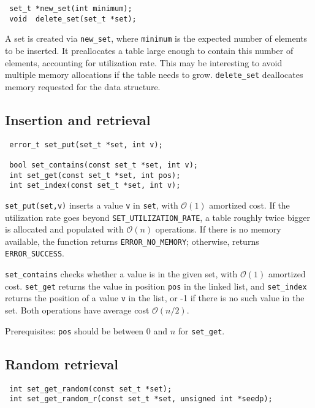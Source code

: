 \begin{lstlisting}
 set_t *new_set(int minimum);
 void  delete_set(set_t *set);
\end{lstlisting}

A set is created via \lstinline!new_set!, where \lstinline!minimum! is the expected number of
elements to be inserted. It preallocates a table large enough to contain this number of
elements, accounting for utilization rate. This may be interesting to avoid multiple memory
allocations if the table needs to grow. 
\lstinline!delete_set! deallocates memory requested for the data structure.

\subsection{Insertion and retrieval}

\begin{lstlisting}
 error_t set_put(set_t *set, int v);
 
 bool set_contains(const set_t *set, int v);
 int set_get(const set_t *set, int pos);
 int set_index(const set_t *set, int v);
\end{lstlisting}

\lstinline!set_put(set,v)! inserts a value \lstinline!v! in \lstinline!set!, with $\mathcal{O}(1)$ amortized cost. 
If the utilization rate goes beyond \lstinline!SET_UTILIZATION_RATE!, a table roughly twice bigger is allocated 
and populated with $\mathcal{O}(n)$ operations. If there is no memory available, the function returns \lstinline!ERROR_NO_MEMORY!;
otherwise, returns \lstinline!ERROR_SUCCESS!.

\lstinline!set_contains! checks whether a value is in the given set, with $\mathcal{O}(1)$ amortized cost. 
\lstinline!set_get! returns the value in position \lstinline!pos! in the linked list, and \lstinline!set_index!
returns the position of a value \lstinline!v! in the list, or -1 if there is no such value in the set. 
Both operations have average cost $\mathcal{O}(n/2)$.

Prerequisites: \lstinline!pos! should be between 0 and $n$ for \lstinline!set_get!.

\subsection{Random retrieval}

\begin{lstlisting}
 int set_get_random(const set_t *set);
 int set_get_random_r(const set_t *set, unsigned int *seedp);
\end{lstlisting}


